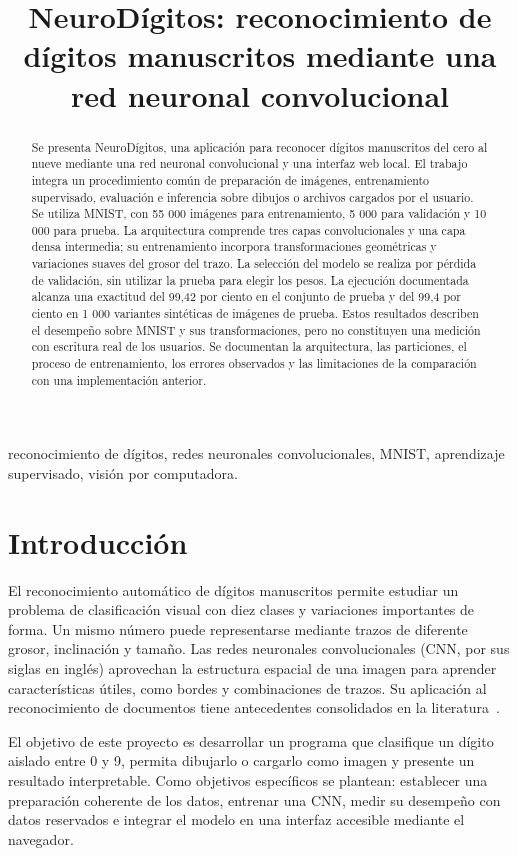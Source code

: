\documentclass[conference]{IEEEtran}
\title{NeuroDígitos: reconocimiento de dígitos manuscritos mediante una red neuronal convolucional}
\begin{document}
\maketitle

\begin{abstract}
Se presenta NeuroDígitos, una aplicación para reconocer dígitos manuscritos del cero al nueve mediante una red neuronal convolucional y una interfaz web local. El trabajo integra un procedimiento común de preparación de imágenes, entrenamiento supervisado, evaluación e inferencia sobre dibujos o archivos cargados por el usuario. Se utiliza MNIST, con 55 000 imágenes para entrenamiento, 5 000 para validación y 10 000 para prueba. La arquitectura comprende tres capas convolucionales y una capa densa intermedia; su entrenamiento incorpora transformaciones geométricas y variaciones suaves del grosor del trazo. La selección del modelo se realiza por pérdida de validación, sin utilizar la prueba para elegir los pesos. La ejecución documentada alcanza una exactitud del 99,42 por ciento en el conjunto de prueba y del 99,4 por ciento en 1 000 variantes sintéticas de imágenes de prueba. Estos resultados describen el desempeño sobre MNIST y sus transformaciones, pero no constituyen una medición con escritura real de los usuarios. Se documentan la arquitectura, las particiones, el proceso de entrenamiento, los errores observados y las limitaciones de la comparación con una implementación anterior.
\end{abstract}
\begin{IEEEkeywords}
reconocimiento de dígitos, redes neuronales convolucionales, MNIST, aprendizaje supervisado, visión por computadora.
\end{IEEEkeywords}

\section{Introducción}
El reconocimiento automático de dígitos manuscritos permite estudiar un problema de clasificación visual con diez clases y variaciones importantes de forma. Un mismo número puede representarse mediante trazos de diferente grosor, inclinación y tamaño. Las redes neuronales convolucionales (CNN, por sus siglas en inglés) aprovechan la estructura espacial de una imagen para aprender características útiles, como bordes y combinaciones de trazos. Su aplicación al reconocimiento de documentos tiene antecedentes consolidados en la literatura~\cite{lecun1998}.

El objetivo de este proyecto es desarrollar un programa que clasifique un dígito aislado entre 0 y 9, permita dibujarlo o cargarlo como imagen y presente un resultado interpretable. Como objetivos específicos se plantean: establecer una preparación coherente de los datos, entrenar una CNN, medir su desempeño con datos reservados e integrar el modelo en una interfaz accesible mediante el navegador.
\end{document}
